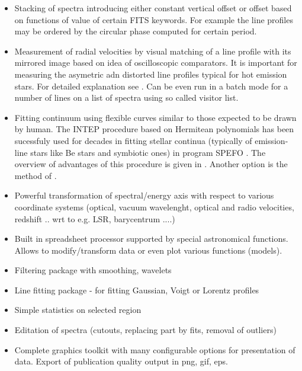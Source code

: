 \documentclass[final,authoryear,5p,times,twocolumn]{elsarticle}
\begin{document}
\begin{itemize}

\item Stacking of spectra introducing either constant vertical offset or
offset based on functions of value of certain FITS keywords. For example the
line profiles may be ordered by the circular phase computed for certain
period.

\item Measurement of radial velocities by visual matching of a line profile
with its mirrored image based on idea of oscilloscopic comparators. It is
important for measuring the asymetric adn distorted line profiles typical for
hot emission stars. For detailed explanation see \citet{2007IAUS..240..486P}.
Can be even run in a batch mode for a number of lines on a list of spectra
using so called visitor list.

\item Fitting continuum using flexible curves similar to those expected to be
drawn by human.  The  INTEP procedure based on Hermitean polynomials
\citep{1982PDAO...16...67H} has been sucessfuly used for decades in fitting stellar
continua (typically of emission-line stars like Be stars and symbiotic ones)
in program SPEFO \citep{1996ASPC..101..187S}. The overview of advantages of
this procedure is given in \citet{2008asvo.proc...97S}. Another option is the
method of \citet{Akima:1970:NMI:321607.321609}.

\item Powerful transformation of spectral/energy axis with respect to various
coordinate systems (optical, vacuum wavelenght, optical and radio velocities,
redshift .. wrt to e.g. LSR, barycentrum ....)

\item Built in spreadsheet processor supported by special astronomical
functions. Allows to modify/transform data or even plot various functions
(models).

\item Filtering package with smoothing, wavelets

\item Line fitting package - for fitting Gaussian, Voigt or Lorentz profiles

\item Simple statistics on selected region

\item Editation of spectra (cutouts, replacing part by fits, removal of outliers)

\item Complete graphics toolkit with many configurable options for
presentation of data. Export of publication quality output in png, gif, eps.


\end{itemize}
\end{document}
